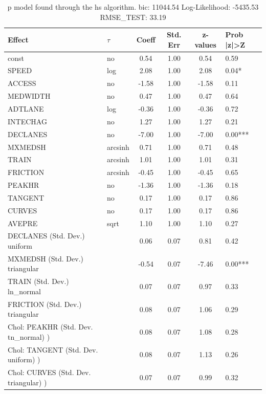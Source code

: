 \begin{table}
	\caption{p model found through the hs algorithm. bic: 11044.54 Log-Likelihood: -5435.53 RMSE_TEST: 33.19}
	\begin{center}
		\begin{tabular}{|l|l|c|c|c|l|}
			\hline
			Effect & $\tau$ & Coeff & Std. Err & z-values & Prob |z|>Z \\
			\hline
			const & no & 0.54 & 1.00 & 0.54 & 0.59 \\
			\hline
			SPEED & log & 2.08 & 1.00 & 2.08 & 0.04* \\
			\hline
			ACCESS & no & -1.58 & 1.00 & -1.58 & 0.11 \\
			\hline
			MEDWIDTH & no & 0.47 & 1.00 & 0.47 & 0.64 \\
			\hline
			ADTLANE & log & -0.36 & 1.00 & -0.36 & 0.72 \\
			\hline
			INTECHAG & no & 1.27 & 1.00 & 1.27 & 0.21 \\
			\hline
			DECLANES & no & -7.00 & 1.00 & -7.00 & 0.00*** \\
			\hline
			MXMEDSH & arcsinh & 0.71 & 1.00 & 0.71 & 0.48 \\
			\hline
			TRAIN & arcsinh & 1.01 & 1.00 & 1.01 & 0.31 \\
			\hline
			FRICTION & arcsinh & -0.45 & 1.00 & -0.45 & 0.65 \\
			\hline
			PEAKHR & no & -1.36 & 1.00 & -1.36 & 0.18 \\
			\hline
			TANGENT & no & 0.17 & 1.00 & 0.17 & 0.86 \\
			\hline
			CURVES & no & 0.17 & 1.00 & 0.17 & 0.86 \\
			\hline
			AVEPRE & sqrt & 1.10 & 1.00 & 1.10 & 0.27 \\
			\hline
			DECLANES (Std. Dev.) uniform &  & 0.06 & 0.07 & 0.81 & 0.42 \\
			\hline
			MXMEDSH (Std. Dev.) triangular &  & -0.54 & 0.07 & -7.46 & 0.00*** \\
			\hline
			TRAIN (Std. Dev.) ln_normal &  & 0.07 & 0.07 & 0.97 & 0.33 \\
			\hline
			FRICTION (Std. Dev.) triangular &  & 0.08 & 0.07 & 1.06 & 0.29 \\
			\hline
			 Chol: PEAKHR (Std. Dev. tn_normal) ) &  & 0.08 & 0.07 & 1.08 & 0.28 \\
			\hline
			 Chol: TANGENT (Std. Dev. uniform) ) &  & 0.08 & 0.07 & 1.13 & 0.26 \\
			\hline
			 Chol: CURVES (Std. Dev. triangular) ) &  & 0.07 & 0.07 & 0.99 & 0.32 \\

\end{tabular}
\end{center}
\end{table}
